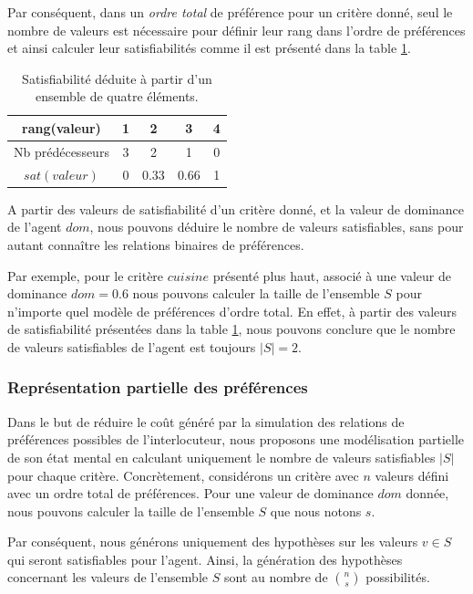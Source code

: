 	Par conséquent, dans un \emph{ordre total} de préférence pour un critère donné, seul le nombre de valeurs est nécessaire pour définir leur rang dans l'ordre de préférences et ainsi calculer leur satisfiabilités comme il est présenté dans la table \ref{tab:poss}. 


	\begin{table}[h]
		\caption{Satisfiabilité déduite à partir d'un ensemble de quatre éléments.}
		\label{tab:poss}
		\centering
		
		\begin{tabular}{ |c|c|c|c|c| }
			\hline				
			rang(valeur) & 1 & 2 & 3 & 4 \\
			\hline
			Nb prédécesseurs & 3 & 2 & 1& 0 \\
			\hline
			$sat(valeur)$ & 0 & 0.33 & 0.66 &1 \\
			\hline
		\end{tabular}
	\end{table}
	
	A partir des valeurs de satisfiabilité d'un critère donné, et la valeur de dominance de l'agent $dom$, nous pouvons déduire le nombre de valeurs satisfiables, sans pour autant connaître les relations binaires de préférences. 
	
	Par exemple, pour le critère $cuisine$ présenté plus haut, associé à une valeur de dominance $dom= 0.6$
	nous pouvons calculer la taille de l'ensemble $S$ pour n'importe quel modèle de préférences d'ordre total. En effet, à partir des valeurs de satisfiabilité présentées dans la table \ref{tab:poss},  nous pouvons conclure que le nombre de valeurs satisfiables de l'agent est toujours $|S| = 2$.
	\subsubsection{Représentation partielle des préférences}
	Dans le but de réduire le coût généré par la simulation des relations de préférences possibles de l'interlocuteur, nous proposons une modélisation partielle de son état mental en calculant uniquement le nombre de valeurs satisfiables $|S|$ pour chaque critère. Concrètement, considérons un critère avec $n$ valeurs défini avec un ordre total de préférences. Pour une valeur de dominance $dom$ donnée, nous pouvons calculer la taille de l'ensemble $S$ que nous notons $s$. 
	
	Par conséquent, nous générons uniquement des hypothèses sur les valeurs $v \in S$ qui seront satisfiables pour l'agent. Ainsi,
	la génération des hypothèses concernant les valeurs de l'ensemble $S$ sont au nombre de  $\binom{n}{s}$ possibilités. 
	
